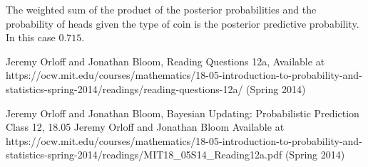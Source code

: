 \documentclass{article}
\begin{document}
The weighted sum of the product of the posterior probabilities and the
probability of heads given the type of coin is the posterior predictive
probability.  In this case $0.715$.

\begin{thebibliography}{99}
Jeremy Orloff and Jonathan Bloom,
Reading Questions 12a,
Available at https://ocw.mit.edu/courses/mathematics/18-05-introduction-to-probability-and-statistics-spring-2014/readings/reading-questions-12a/
(Spring 2014)

Jeremy Orloff and Jonathan Bloom,
Bayesian Updating: Probabilistic Prediction Class 12, 18.05 Jeremy Orloff and 
Jonathan Bloom
Available at https://ocw.mit.edu/courses/mathematics/18-05-introduction-to-probability-and-statistics-spring-2014/readings/MIT18_05S14_Reading12a.pdf
(Spring 2014)

\end{thebibliography}
\end{document}
